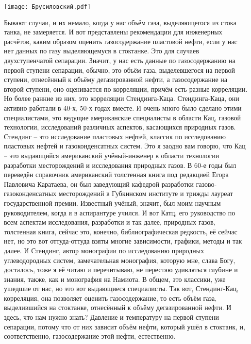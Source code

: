 \documentclass[main.tex]{subfiles}
\begin{document}
\begin{center}
\texttt{[image: Брусиловский.pdf]}
\end{center}

Бывают случаи, и их немало, когда у нас объём газа, выделяющегося из стока танка, не замеряется.
И вот представлены рекомендации для инженерных расчётов, каким образом оценить газосодержание пластовой нефти, если у нас нет данных по газу выделяющемуся в стоктанке.
Это для случаев двухступенчатой сепарации.
Значит, у нас есть данные по газосодержанию на первой ступени сепарации, обычно, это объём газа, выделевшегося на первой ступени, отнесённый к объёму дегазированной нефти, а газосодержание на второй ступени, оно оценивается по корреляции, причём есть разные корреляции.
Но более ранние из них, это корреляции Стендинга-Каца.
Стендинга-Каца, они активно работали в 40-х, 50-х годах
вместе.
И очень много было сделано этими специалистами, это ведущие американские специалисты в области Кац, газовой технологии, исследований различных аспектов, касающихся природных газов.
Стендинг -- это исследование пластовых нефтей, классик по исследованию пластовых нефтей и газоконденсатных систем.
Это я заодно вам говорю, что Кац -- это выдающийся американский учёный-инженер в области технологии разработки месторождений и исследования природных газов.
В 60-е годы был переведён справочник американский толстенная книга под редакцией Егора Павловича Каратаева, он был заведующий кафедрой разработки газово-газоконденсатных месторождений в Губкинском институте и трижды лауреат государственной премии.
Известный учёный, значит, был моим научным руководителем, когда я в аспирантуре учился.
И вот Катц, его руководство по всем аспектам исследования, разработки и так далее, природных газов, толстенная книга, сейчас это, конечно, библиографическая редкость, её сейчас нет, но это вот оттуда-оттуда взяты многие зависимости, графики, методы и так далее.
И Стендинг, автор монографии по исследованию природных углеводородных систем, замечательная монография, которую мне, слава Богу, досталось, тоже я её читаю и перечитываю, не перестаю удивляться глубине и знания, также, как и монография на Намиота.
В общем, это классики, уже ушедшие от нас, но это вот выдающиеся специалисты.
Так вот, Стендинг-Кац, корреляция, она позволяет оценить газосодержание, то есть объём газа, выделившийся на стоктанке, отнесённый к объёму дегазированной нефти.
И здесь, что нам нужно знать?
Давление и температуру на первой ступени сепарации, потому что от них зависит объём нефти, который ушёл в стоктанк, и, соответственно, газосодержание этой нефти, естественно.
\end{document}
